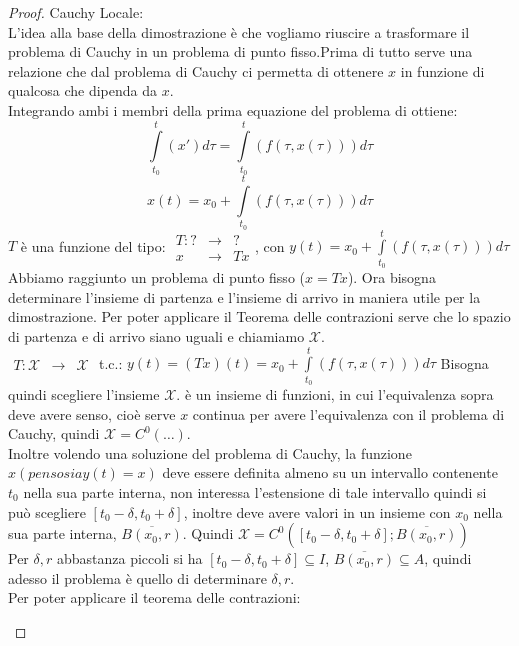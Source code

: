 \begin{proof}
	Cauchy Locale:\\
	L'idea alla base della dimostrazione è che vogliamo riuscire a trasformare il problema di Cauchy in un problema di punto fisso.Prima di tutto serve una relazione che dal problema di Cauchy ci permetta di ottenere $x$ in funzione di qualcosa che dipenda da $x$.\\
	Integrando ambi i membri della prima equazione del problema di ottiene:
	$$\int\limits_{t_0}^t( x')d\tau=\int\limits_{t_0}^t(f(\tau,x(\tau)))d\tau$$
	$$x(t)=x_0+\int\limits_{t_0}^t(f(\tau,x(\tau)))d\tau$$
	$T$ è una funzione del tipo:
	$\begin{array}{rcl} T: ? & \to & ? \\ x & \to & Tx \end{array}$, con $y(t)=x_0+\int\limits_{t_0}^t(f(\tau,x(\tau)))d\tau$\\
	Abbiamo raggiunto un problema di punto fisso ($x=Tx$). Ora bisogna determinare l'insieme di partenza e l'insieme di arrivo in maniera utile per la dimostrazione. Per poter applicare il Teorema delle contrazioni serve che lo spazio di partenza e di arrivo siano uguali e chiamiamo $\mathcal{X}$.\\
	$\begin{array}{rcl} T: \mathcal{X} & \to & \mathcal{X} \end{array}$ t.c.: $y(t)=(Tx)(t)=x_0+\int\limits_{t_0}^t(f(\tau,x(\tau)))d\tau$
	Bisogna quindi scegliere l'insieme $\mathcal{X}$. è un insieme di funzioni, in cui l'equivalenza sopra deve avere senso, cioè serve $x$ continua per avere l'equivalenza con il problema di Cauchy, quindi $\mathcal{X}=C^0(\ldots)$.\\
	Inoltre volendo una soluzione del problema di Cauchy, la funzione $x(penso sia y(t)=x)$ deve essere definita almeno su un intervallo contenente $t_0$ nella sua parte interna, non interessa l'estensione di tale intervallo quindi si può scegliere $\left[t_0-\delta,t_0+\delta\right]$, inoltre deve avere valori in un insieme con $x_0$ nella sua parte interna, $\overline{B(x_0,r)}$. Quindi $\mathcal{X}=C^0(\left[t_0-\delta,t_0+\delta\right];\overline{B(x_0,r)})$\\
	Per $\delta, r$ abbastanza piccoli si ha $\left[t_0-\delta,t_0+\delta\right]\subseteq I$, $\overline{B(x_0,r)}\subseteq A$, quindi adesso il problema è quello di determinare $\delta, r$.\\
	Per poter applicare il teorema delle contrazioni:
	\begin{description}

\end{description}
\end{proof}
